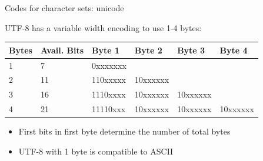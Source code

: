\begin{vbframe}{Codes for character sets: unicode}
\framebreak

UTF-8 has a variable width encoding to use 1-4 bytes:
  \begin{table}
    \begin{tabular}{llllll}
      \toprule
    Bytes & Avail. Bits & Byte 1   & Byte 2   & Byte 3   & Byte 4   \\ \midrule
    1     & 7           & 0xxxxxxx &          &          &          \\
    2     & 11          & 110xxxxx & 10xxxxxx &          &          \\
    3     & 16          & 1110xxxx & 10xxxxxx & 10xxxxxx &          \\
    4     & 21          & 11110xxx & 10xxxxxx & 10xxxxxx & 10xxxxxx \\
    \bottomrule
    \end{tabular}
  \end{table}
\begin{itemize}
  \item First bits in first byte determine the number of total bytes
  \item UTF-8 with 1 byte is compatible to ASCII
\end{itemize}

\end{vbframe}


\endlecture



